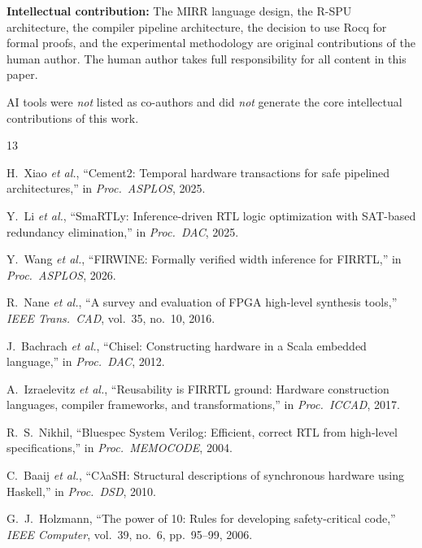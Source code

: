 \documentclass[conference]{IEEEtran}
\begin{document}
\textbf{Intellectual contribution:} The MIRR language design, the
R-SPU architecture, the compiler pipeline architecture, the decision
to use Rocq for formal proofs, and the experimental methodology are
original contributions of the human author.  The human author takes
full responsibility for all content in this paper.

AI tools were \emph{not} listed as co-authors and did \emph{not}
generate the core intellectual contributions of this work.

\balance

\begin{thebibliography}{13}

H.~Xiao \emph{et al.}, ``Cement2: Temporal hardware transactions for
safe pipelined architectures,'' in \emph{Proc.\ ASPLOS}, 2025.

Y.~Li \emph{et al.}, ``SmaRTLy: Inference-driven RTL logic optimization
with SAT-based redundancy elimination,'' in \emph{Proc.\ DAC}, 2025.

Y.~Wang \emph{et al.}, ``FIRWINE: Formally verified width inference for
FIRRTL,'' in \emph{Proc.\ ASPLOS}, 2026.

R.~Nane \emph{et al.}, ``A survey and evaluation of FPGA high-level
synthesis tools,'' \emph{IEEE Trans.\ CAD}, vol.~35, no.~10, 2016.

J.~Bachrach \emph{et al.}, ``Chisel: Constructing hardware in a Scala
embedded language,'' in \emph{Proc.\ DAC}, 2012.

A.~Izraelevitz \emph{et al.}, ``Reusability is FIRRTL ground: Hardware
construction languages, compiler frameworks, and transformations,'' in
\emph{Proc.\ ICCAD}, 2017.

R.~S.~Nikhil, ``Bluespec System Verilog: Efficient, correct RTL from
high-level specifications,'' in \emph{Proc.\ MEMOCODE}, 2004.

C.~Baaij \emph{et al.}, ``C$\lambda$aSH: Structural descriptions of
synchronous hardware using Haskell,'' in \emph{Proc.\ DSD}, 2010.

G.~J.~Holzmann, ``The power of 10: Rules for developing safety-critical
code,'' \emph{IEEE Computer}, vol.~39, no.~6, pp.~95--99, 2006.


\end{thebibliography}
\end{document}
